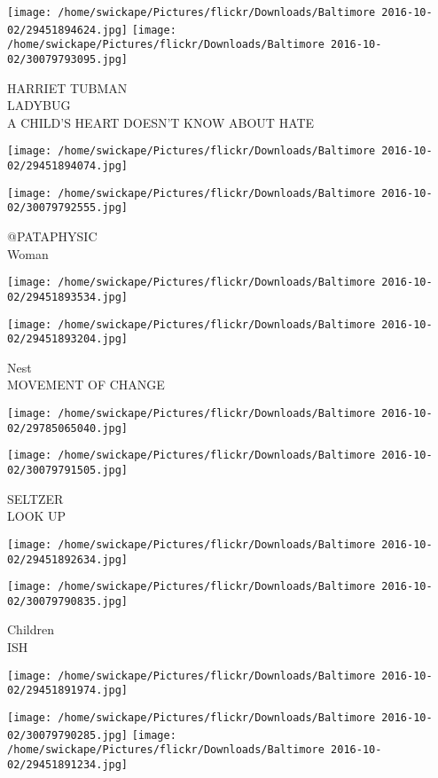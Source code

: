 \documentclass[10pt,letterpaper]{article}
\begin{document}
\vspace{0.25in}
\texttt{[image: /home/swickape/Pictures/flickr/Downloads/Baltimore 2016-10-02/29451894624.jpg]}
\texttt{[image: /home/swickape/Pictures/flickr/Downloads/Baltimore 2016-10-02/30079793095.jpg]}

HARRIET TUBMAN\\
LADYBUG\\
A CHILD'S HEART DOESN'T KNOW ABOUT HATE
\pagebreak

\texttt{[image: /home/swickape/Pictures/flickr/Downloads/Baltimore 2016-10-02/29451894074.jpg]}

\vspace{0.25in}
\texttt{[image: /home/swickape/Pictures/flickr/Downloads/Baltimore 2016-10-02/30079792555.jpg]}

@PATAPHYSIC\\
Woman
\pagebreak

\texttt{[image: /home/swickape/Pictures/flickr/Downloads/Baltimore 2016-10-02/29451893534.jpg]}

\vspace{0.25in}
\texttt{[image: /home/swickape/Pictures/flickr/Downloads/Baltimore 2016-10-02/29451893204.jpg]}

Nest\\
MOVEMENT OF CHANGE
\pagebreak

\texttt{[image: /home/swickape/Pictures/flickr/Downloads/Baltimore 2016-10-02/29785065040.jpg]}

\vspace{0.25in}
\texttt{[image: /home/swickape/Pictures/flickr/Downloads/Baltimore 2016-10-02/30079791505.jpg]}

SELTZER\\
LOOK UP
\pagebreak

\texttt{[image: /home/swickape/Pictures/flickr/Downloads/Baltimore 2016-10-02/29451892634.jpg]}

\vspace{0.25in}
\texttt{[image: /home/swickape/Pictures/flickr/Downloads/Baltimore 2016-10-02/30079790835.jpg]}

Children\\
ISH
\pagebreak

\texttt{[image: /home/swickape/Pictures/flickr/Downloads/Baltimore 2016-10-02/29451891974.jpg]}

\vspace{0.25in}
\texttt{[image: /home/swickape/Pictures/flickr/Downloads/Baltimore 2016-10-02/30079790285.jpg]}
\texttt{[image: /home/swickape/Pictures/flickr/Downloads/Baltimore 2016-10-02/29451891234.jpg]}
\end{document}
